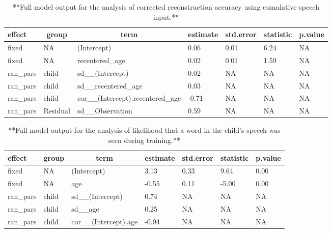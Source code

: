 \documentclass[man,mask,floatsintext]{apa6}
\begin{document}
\begin{table}[tbp]
\begin{center}
\begin{threeparttable}
\caption{\label{tab:tab-corr_reconstr_acc-cumu-MAIN}**Full model output for the analysis of corrected reconstruction accuracy using cumulative speech input.**}
\begin{tabular}{lllllll}
\toprule
effect & \multicolumn{1}{c}{group} & \multicolumn{1}{c}{term} & \multicolumn{1}{c}{estimate} & \multicolumn{1}{c}{std.error} & \multicolumn{1}{c}{statistic} & \multicolumn{1}{c}{p.value}\\
\midrule
fixed & NA & (Intercept) & 0.06 & 0.01 & 6.24 & NA\\
fixed & NA & recentered\_age & 0.02 & 0.01 & 1.59 & NA\\
ran\_pars & child & sd\_\_(Intercept) & 0.02 & NA & NA & NA\\
ran\_pars & child & sd\_\_recentered\_age & 0.03 & NA & NA & NA\\
ran\_pars & child & cor\_\_(Intercept).recentered\_age & -0.71 & NA & NA & NA\\
ran\_pars & Residual & sd\_\_Observation & 0.59 & NA & NA & NA\\
\bottomrule
\end{tabular}
\end{threeparttable}
\end{center}
\end{table}

\begin{table}[tbp]
\begin{center}
\begin{threeparttable}
\caption{\label{tab:tab-unseen_words-local-MAIN}**Full model output for the analysis of likelihood that a word in the child's speech was seen during training.**}
\begin{tabular}{lllllll}
\toprule
effect & \multicolumn{1}{c}{group} & \multicolumn{1}{c}{term} & \multicolumn{1}{c}{estimate} & \multicolumn{1}{c}{std.error} & \multicolumn{1}{c}{statistic} & \multicolumn{1}{c}{p.value}\\
\midrule
fixed & NA & (Intercept) & 3.13 & 0.33 & 9.64 & 0.00\\
fixed & NA & age & -0.55 & 0.11 & -5.00 & 0.00\\
ran\_pars & child & sd\_\_(Intercept) & 0.74 & NA & NA & NA\\
ran\_pars & child & sd\_\_age & 0.25 & NA & NA & NA\\
ran\_pars & child & cor\_\_(Intercept).age & -0.94 & NA & NA & NA\\
\bottomrule
\end{tabular}
\end{threeparttable}
\end{center}
\end{table}
\end{document}
